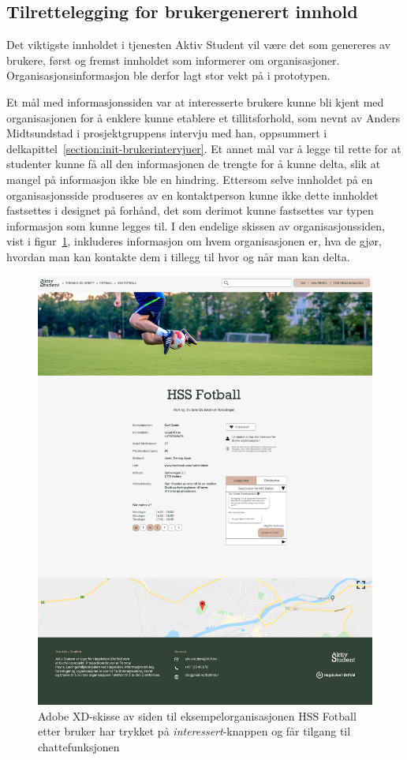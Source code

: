 \subsection{Tilrettelegging for brukergenerert innhold}
Det viktigste innholdet i tjenesten Aktiv Student vil være det som genereres av brukere, først og fremst innholdet som informerer om organisasjoner. Organisasjonsinformasjon ble derfor lagt stor vekt på i prototypen.

Et mål med informasjonssiden var at interesserte brukere kunne bli kjent med organisasjonen for å enklere kunne etablere et tillitsforhold, som nevnt av Anders Midtsundstad i prosjektgruppens intervju med han, oppsummert i delkapittel~\ref{section:init-brukerintervjuer}. Et annet mål var å legge til rette for at studenter kunne få all den informasjonen de trengte for å kunne delta, slik at mangel på informasjon ikke ble en hindring. Ettersom selve innholdet på en organisasjonsside produseres av en kontaktperson kunne ikke dette innholdet fastsettes i designet på forhånd, det som derimot kunne fastsettes var typen informasjon som kunne legges til.  I den endelige skissen av organisasjonssiden, vist i figur~\ref{fig:3-6-org-trykket-interessert}, inkluderes informasjon om hvem organisasjonen er, hva de gjør, hvordan man kan kontakte dem i tillegg til hvor og når man kan delta.

\begin{figure}[H]
\centering
\includegraphics[width=.7\textwidth]{Illustrasjoner/Skisser-pdf/3.0/3-6-organisasjonsside-trykket-interessert.pdf}
\caption{Adobe XD-skisse av siden til eksempelorganisasjonen HSS Fotball etter bruker har trykket på {\em interessert}-knappen og får tilgang til chattefunksjonen}
\label{fig:3-6-org-trykket-interessert}
\end{figure}

